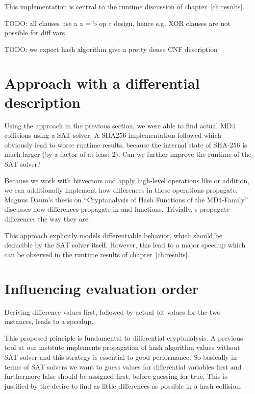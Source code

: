 This implementation is central to the runtime discussion of chapter~\ref{ch:results}.

TODO: all clauses use a a = b op c design, hence e.g. XOR clauses are not possible for diff vars

TODO: we expect hash algorithm give a pretty dense CNF description

\section{Approach with a differential description}
\label{sec:enc-diff-desc}
%
Using the approach in the previous section, we were able to find actual MD4 collisions
using a SAT solver. A SHA256 implementation followed which obviously lead to worse
runtime results, because the internal state of SHA-256 is much larger (by a factor
of at least 2). Can we further improve the runtime of the SAT solver?

Because we work with bitvectors and apply high-level operations like  or addition,
we can additionally implement how differences in those operations propagate.
Magnus Daum's thesis on \enquote{Cryptanalysis of Hash Functions of the
MD4-Family}~\cite[Table 4.4]{daum} discusses how differences propagate in  and
 functions. Trivially, s propagate differences the way they are.

This approach explicitly models differentiable behavior, which should be deducible
by the SAT solver itself. However, this lead to a major speedup which can be observed
in the runtime results of chapter~\ref{ch:results}.

\section{Influencing evaluation order}
\label{sec:enc-order}
%
\begin{prop}
  Deriving difference values first, followed by actual bit values for the two instances,
  leads to a speedup.
\end{prop}

This proposed principle is fundamental to differential cryptanalysis. A previous tool
at our institute implements propagation of hash algorithm values without SAT solver
and this strategy is essential to good performance. So basically in terms of SAT solvers
we want to guess values for differential variables first and furthermore false should
be assigned first, before guessing for true. This is justified by the desire to find as
little differences as possible in a hash collision.

